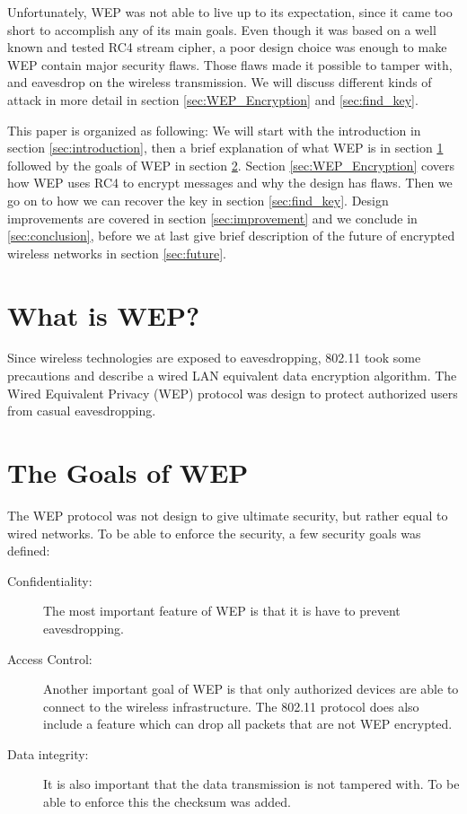\documentclass[twocolumn,11pt]{IEEEtran}
\begin{document}
Unfortunately, WEP was not able to live up to its expectation, since it came too short to accomplish any of its main goals. Even though it was based on a well known and tested RC4 stream cipher, a poor design choice was enough to make WEP contain major security flaws. Those flaws made it possible to tamper with, and eavesdrop on the wireless transmission. We will discuss different kinds of attack in more detail in section \ref{sec:WEP_Encryption} and \ref{sec:find_key}.

This paper is organized as following: We will start with the introduction in section \ref{sec:introduction}, then a brief explanation of what WEP is in section \ref{sec:whatiswep} followed by the goals of WEP in section \ref{sec:goals}. Section \ref{sec:WEP_Encryption} covers how WEP uses RC4 to encrypt messages and why the design has flaws. Then we go on to how we can recover the key in section \ref{sec:find_key}. Design improvements are covered in section \ref{sec:improvement} and we conclude in \ref{sec:conclusion}, before we at last give brief description of the future of encrypted wireless networks in section \ref{sec:future}.

\section {What is WEP?}
\label{sec:whatiswep}

Since wireless technologies are exposed to eavesdropping, 802.11 took some precautions and describe a wired LAN equivalent data encryption algorithm. The Wired Equivalent Privacy (WEP) protocol was design to protect authorized users from casual eavesdropping.  

\section {The Goals of WEP}
\label{sec:goals}

The WEP protocol was not design to give ultimate security, but rather equal to wired networks. To be able to enforce the security, a few security goals was defined\cite{IEEE:Fast}:\\

\begin{description}
\item[Confidentiality:] The most important feature of WEP is that it is have to prevent eavesdropping.
\item[Access Control:] Another important goal of WEP is that only authorized devices are able to connect to the wireless infrastructure. The 802.11 protocol does also include a feature which can drop all packets that are not WEP encrypted.
\item[Data integrity:] It is also important that the data transmission is not tampered with. To be able to enforce this the checksum was added.\\
\end{description}
\end{document}

